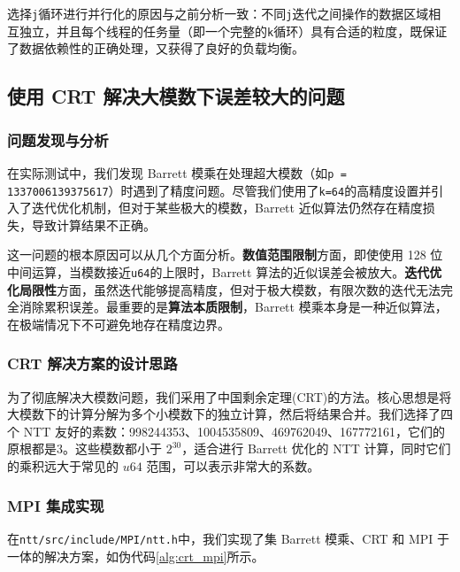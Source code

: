 \documentclass[a4paper]{article}
\begin{document}
选择\texttt{j}循环进行并行化的原因与之前分析一致：不同\texttt{j}迭代之间操作的数据区域相互独立，并且每个线程的任务量（即一个完整的\texttt{k}循环）具有合适的粒度，既保证了数据依赖性的正确处理，又获得了良好的负载均衡。

\subsection{使用 CRT 解决大模数下误差较大的问题}

\subsubsection{问题发现与分析}

在实际测试中，我们发现 Barrett 模乘在处理超大模数（如\texttt{p = 1337006139375617}）时遇到了精度问题。尽管我们使用了\texttt{k=64}的高精度设置并引入了迭代优化机制，但对于某些极大的模数，Barrett 近似算法仍然存在精度损失，导致计算结果不正确。

这一问题的根本原因可以从几个方面分析。\textbf{数值范围限制}方面，即使使用 128 位中间运算，当模数接近\texttt{u64}的上限时，Barrett 算法的近似误差会被放大。\textbf{迭代优化局限性}方面，虽然迭代能够提高精度，但对于极大模数，有限次数的迭代无法完全消除累积误差。最重要的是\textbf{算法本质限制}，Barrett 模乘本身是一种近似算法，在极端情况下不可避免地存在精度边界。

\subsubsection{CRT 解决方案的设计思路}

为了彻底解决大模数问题，我们采用了中国剩余定理(CRT)的方法。核心思想是将大模数下的计算分解为多个小模数下的独立计算，然后将结果合并。我们选择了四个 NTT 友好的素数：998244353、1004535809、469762049、167772161，它们的原根都是3。这些模数都小于 $2^{30}$，适合进行 Barrett 优化的 NTT 计算，同时它们的乘积远大于常见的 $u64$ 范围，可以表示非常大的系数。

\subsubsection{MPI 集成实现}

在\texttt{ntt/src/include/MPI/ntt.h}中，我们实现了集 Barrett 模乘、CRT 和 MPI 于一体的解决方案，如伪代码\ref{alg:crt_mpi}所示。
\end{document}
